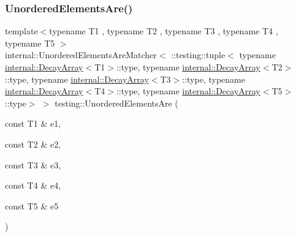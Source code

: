 \subsubsection{\texorpdfstring{UnorderedElementsAre()}{UnorderedElementsAre()}\hspace{0.1cm}{\footnotesize\ttfamily [6/11]}}
{\footnotesize\ttfamily template$<$typename T1 , typename T2 , typename T3 , typename T4 , typename T5 $>$ \\
internal\+::\+Unordered\+Elements\+Are\+Matcher$<$ \+::testing\+::tuple$<$ typename \mbox{\hyperlink{structtesting_1_1internal_1_1DecayArray}{internal\+::\+Decay\+Array}}$<$T1$>$\+::type, typename \mbox{\hyperlink{structtesting_1_1internal_1_1DecayArray}{internal\+::\+Decay\+Array}}$<$T2$>$\+::type, typename \mbox{\hyperlink{structtesting_1_1internal_1_1DecayArray}{internal\+::\+Decay\+Array}}$<$T3$>$\+::type, typename \mbox{\hyperlink{structtesting_1_1internal_1_1DecayArray}{internal\+::\+Decay\+Array}}$<$T4$>$\+::type, typename \mbox{\hyperlink{structtesting_1_1internal_1_1DecayArray}{internal\+::\+Decay\+Array}}$<$T5$>$\+::type$>$ $>$ testing\+::\+Unordered\+Elements\+Are (\begin{DoxyParamCaption}\item[{const T1 \&}]{e1,  }\item[{const T2 \&}]{e2,  }\item[{const T3 \&}]{e3,  }\item[{const T4 \&}]{e4,  }\item[{const T5 \&}]{e5 }\end{DoxyParamCaption})\hspace{0.3cm}{\ttfamily [inline]}}

\mbox{\label{namespacetesting_aff1859501ecd94dd1bc428d146a66fdc}} 
